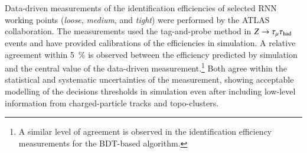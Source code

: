 Data-driven measurements of the \tauhadvis identification efficiencies of
selected RNN \tauid working points (\emph{loose}, \emph{medium}, and
\emph{tight}) were performed by the ATLAS collaboration. The measurements used
the tag-and-probe method in $Z \to \tau_\mu \tau_{\text{had}}$ events and have provided
calibrations of the \tauhadvis efficiencies in simulation. A relative agreement
within \SI{5}{\percent} is observed between the efficiency predicted by
simulation and the central value of the data-driven measurement.\footnote{A
  similar level of agreement is observed in the \tauhadvis identification
  efficiency measurements for the BDT-based algorithm.} Both agree within the
statistical and systematic uncertainties of the measurement, showing acceptable
modelling of the \tauid decisions thresholds in simulation even after including
low-level information from charged-particle tracks and topo-clusters.

